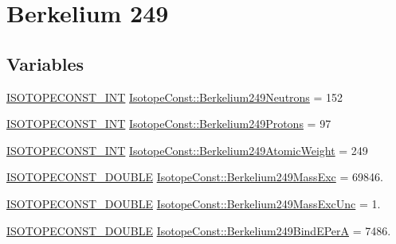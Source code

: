 \hypertarget{group___isotope_const-_berkelium-_bk249}{}\section{Berkelium 249}
\label{group___isotope_const-_berkelium-_bk249}
\subsection*{Variables}
\begin{DoxyCompactItemize}
\item 
\mbox{\hyperlink{group___isotope_const-_macros_ga5f18360b3e99483a35c32d789e62621c}{I\+S\+O\+T\+O\+P\+E\+C\+O\+N\+S\+T\+\_\+\+I\+NT}} \mbox{\hyperlink{group___isotope_const-_berkelium-_bk249_ga6d6f03c334651705b21a7a8426d7acc2}{Isotope\+Const\+::\+Berkelium249\+Neutrons}} = 152
\item 
\mbox{\hyperlink{group___isotope_const-_macros_ga5f18360b3e99483a35c32d789e62621c}{I\+S\+O\+T\+O\+P\+E\+C\+O\+N\+S\+T\+\_\+\+I\+NT}} \mbox{\hyperlink{group___isotope_const-_berkelium-_bk249_ga9ca8051c72b0a0981de9d826defde08b}{Isotope\+Const\+::\+Berkelium249\+Protons}} = 97
\item 
\mbox{\hyperlink{group___isotope_const-_macros_ga5f18360b3e99483a35c32d789e62621c}{I\+S\+O\+T\+O\+P\+E\+C\+O\+N\+S\+T\+\_\+\+I\+NT}} \mbox{\hyperlink{group___isotope_const-_berkelium-_bk249_gadf1d5fa15a4ef37c05c59dcdec452936}{Isotope\+Const\+::\+Berkelium249\+Atomic\+Weight}} = 249
\item 
\mbox{\hyperlink{group___isotope_const-_macros_ga8f45a7272ce02c0b4c65c44636ed719a}{I\+S\+O\+T\+O\+P\+E\+C\+O\+N\+S\+T\+\_\+\+D\+O\+U\+B\+LE}} \mbox{\hyperlink{group___isotope_const-_berkelium-_bk249_ga3584127ab76b7689774bc95fba921f1f}{Isotope\+Const\+::\+Berkelium249\+Mass\+Exc}} = 69846.
\item 
\mbox{\hyperlink{group___isotope_const-_macros_ga8f45a7272ce02c0b4c65c44636ed719a}{I\+S\+O\+T\+O\+P\+E\+C\+O\+N\+S\+T\+\_\+\+D\+O\+U\+B\+LE}} \mbox{\hyperlink{group___isotope_const-_berkelium-_bk249_gae4c1bdd58e26018bb1619ef45d695c3b}{Isotope\+Const\+::\+Berkelium249\+Mass\+Exc\+Unc}} = 1.
\item 
\mbox{\hyperlink{group___isotope_const-_macros_ga8f45a7272ce02c0b4c65c44636ed719a}{I\+S\+O\+T\+O\+P\+E\+C\+O\+N\+S\+T\+\_\+\+D\+O\+U\+B\+LE}} \mbox{\hyperlink{group___isotope_const-_berkelium-_bk249_ga2278015970a9b876a1fb4c2c2949ad4c}{Isotope\+Const\+::\+Berkelium249\+Bind\+E\+PerA}} = 7486.
\item 

\end{DoxyCompactItemize}
